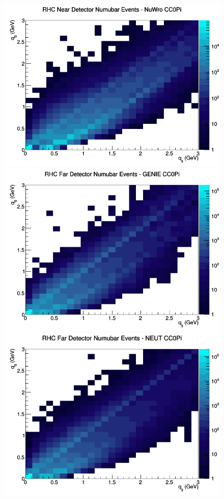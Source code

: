 \begin{figure}[h]
\includegraphics[width=\linewidth]{eff_q0_q3/FGT/CC0Pi_RHC_ND_numubar_q3_q0_NuWro.png}
\endminipage
\newline
{}
\includegraphics[width=\linewidth]{eff_q0_q3/FGT/CC0Pi_RHC_FD_numubar_q3_q0_GENIE.png}
\endminipage
{}
\includegraphics[width=\linewidth]{eff_q0_q3/FGT/CC0Pi_RHC_FD_numubar_q3_q0_NEUT.png}

\end{figure}
